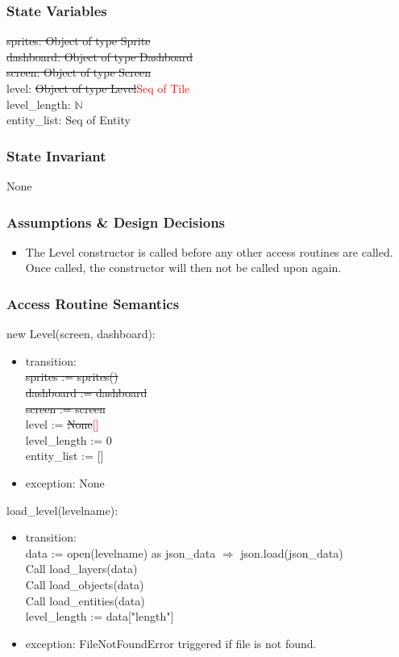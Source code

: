 \documentclass[12pt]{article}
\begin{document}
\subsubsection*{State Variables}
\st{sprites: Object of type Sprite\\
dashboard: Object of type Dashboard\\
screen: Object of type Screen}\\
level: \st{Object of type Level}\textcolor{red}{Seq of Tile}\\
level\_length: $\mathbb{N}$\\
entity\_list: Seq of Entity

\subsubsection*{State Invariant}
None
\subsubsection*{Assumptions \& Design Decisions}
\begin{itemize}
    \item The Level constructor is called before any other access routines are called. Once called, the constructor will then not be called upon again.
\end{itemize}

\subsubsection*{Access Routine Semantics}
new Level(screen, dashboard):
\begin{itemize}
    \item transition:\\
    \st{sprites := sprites()\\
    dashboard := dashboard\\
    screen := screen}\\
    level := \st{None}\textcolor{red}{[]}\\
    level\_length := 0\\
    entity\_list := []\\
    \item exception: None
\end{itemize}

load\_level(levelname):
\begin{itemize}
    \item transition: \\
    data := open(levelname) as json\_data $\Rightarrow$ json.load(json\_data)\\ 
    Call load\_layers(data)\\
    Call load\_objects(data)\\
    Call load\_entities(data)\\
    level\_length := data["length"]
    \item exception: FileNotFoundError triggered if file is not found.
\end{itemize}
\end{document}
